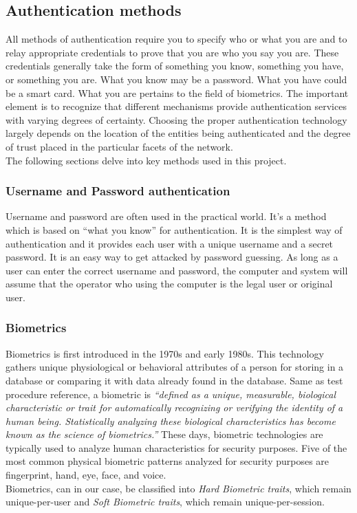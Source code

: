 \documentclass[12pt]{article}			%
\begin{document}
\subsection{ Authentication methods }
All methods of authentication require you to specify who or what you are and to relay appropriate
credentials to prove that you are who you say you are. These credentials generally take the form
of something you know, something you have, or something you are. What you know may be a
password. What you have could be a smart card. What you are pertains to the field of biometrics.
The important element is to recognize that different mechanisms provide
authentication services with varying degrees of certainty. Choosing the proper authentication
technology largely depends on the location of the entities being authenticated and the degree of
trust placed in the particular facets of the network.\\
The following sections delve into key methods used in this project.

\subsubsection{ Username and Password authentication }
Username and password are often used in the practical world. It’s a method which is based on “what you know” for authentication.
It is the simplest way of authentication and it provides each user with a unique username and a
secret password. It is an easy way to get attacked by password guessing. As long as a user can enter the correct username and password, the
computer and system will assume that the operator who using the computer is the legal user or original user.

\subsubsection{ Biometrics }
Biometrics is first introduced in the 1970s and early 1980s. This technology gathers unique
physiological or behavioral attributes of a person for storing in a database or comparing it with
data already found in the database. Same as test procedure reference, a biometric is \emph{“defined as a
unique, measurable, biological characteristic or trait for automatically recognizing or verifying
the identity of a human being. Statistically analyzing these biological characteristics has become
known as the science of biometrics.”} These days, biometric technologies are typically
used to analyze human characteristics for security purposes. Five of the most common physical
biometric patterns analyzed for security purposes are fingerprint, hand, eye, face, and voice.\\
Biometrics, can in our case, be classified into \emph{Hard Biometric traits}, which remain unique-per-user and
\emph{Soft Biometric traits}, which remain unique-per-session.
\end{document}
